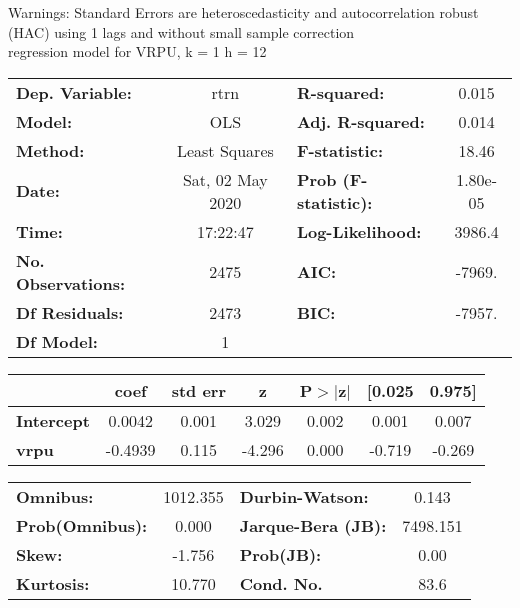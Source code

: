 Warnings: \newline
 [1] Standard Errors are heteroscedasticity and autocorrelation robust (HAC) using 1 lags and without small sample correction\\ 

regression model for VRPU, k = 1 h = 12\begin{center}
\begin{tabular}{lclc}
\toprule
\textbf{Dep. Variable:}    &       rtrn       & \textbf{  R-squared:         } &     0.015   \\
\textbf{Model:}            &       OLS        & \textbf{  Adj. R-squared:    } &     0.014   \\
\textbf{Method:}           &  Least Squares   & \textbf{  F-statistic:       } &     18.46   \\
\textbf{Date:}             & Sat, 02 May 2020 & \textbf{  Prob (F-statistic):} &  1.80e-05   \\
\textbf{Time:}             &     17:22:47     & \textbf{  Log-Likelihood:    } &    3986.4   \\
\textbf{No. Observations:} &        2475      & \textbf{  AIC:               } &    -7969.   \\
\textbf{Df Residuals:}     &        2473      & \textbf{  BIC:               } &    -7957.   \\
\textbf{Df Model:}         &           1      & \textbf{                     } &             \\
\bottomrule
\end{tabular}
\begin{tabular}{lcccccc}
                   & \textbf{coef} & \textbf{std err} & \textbf{z} & \textbf{P$> |$z$|$} & \textbf{[0.025} & \textbf{0.975]}  \\
\midrule
\textbf{Intercept} &       0.0042  &        0.001     &     3.029  &         0.002        &        0.001    &        0.007     \\
\textbf{vrpu}      &      -0.4939  &        0.115     &    -4.296  &         0.000        &       -0.719    &       -0.269     \\
\bottomrule
\end{tabular}
\begin{tabular}{lclc}
\textbf{Omnibus:}       & 1012.355 & \textbf{  Durbin-Watson:     } &    0.143  \\
\textbf{Prob(Omnibus):} &   0.000  & \textbf{  Jarque-Bera (JB):  } & 7498.151  \\
\textbf{Skew:}          &  -1.756  & \textbf{  Prob(JB):          } &     0.00  \\
\textbf{Kurtosis:}      &  10.770  & \textbf{  Cond. No.          } &     83.6  \\
\bottomrule
\end{tabular}
\end{center}

